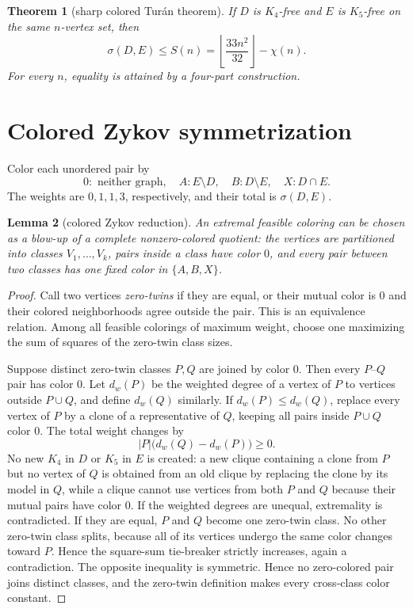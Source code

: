 \documentclass[11pt]{article}
\theoremstyle{plain}
\newtheorem{theorem}{Theorem}[section]
\newtheorem{lemma}[theorem]{Lemma}
\theoremstyle{definition}
\theoremstyle{remark}
\newcommand{\1}{\mathbf 1}
\begin{document}
\begin{theorem}[sharp colored Tur\'an theorem]\label{thm:colored}
If $D$ is $K_4$-free and $E$ is $K_5$-free on the same $n$-vertex set, then
\begin{equation}\label{eq:colored}
 \sigma(D,E)\leq S(n)
 =\left\lfloor\frac{33n^2}{32}\right\rfloor-\chi(n).
\end{equation}
For every $n$, equality is attained by a four-part construction.
\end{theorem}

\section{Colored Zykov symmetrization}\label{sec:zykov}

Color each unordered pair by
\[
 0:\text{ neither graph},\quad
 A:E\setminus D,\quad
 B:D\setminus E,\quad
 X:D\cap E.
\]
The weights are $0,1,1,3$, respectively, and their total is $\sigma(D,E)$.

\begin{lemma}[colored Zykov reduction]\label{lem:zykov}
An extremal feasible coloring can be chosen as a blow-up of a complete
nonzero-colored quotient: the vertices are partitioned into classes
$V_1,\ldots,V_k$, pairs inside a class have color $0$, and every pair between
two classes has one fixed color in $\{A,B,X\}$.
\end{lemma}

\begin{proof}
Call two vertices \emph{zero-twins} if they are equal, or their mutual color
is $0$ and their colored neighborhoods agree outside the pair.  This is an
equivalence relation.  Among all feasible colorings of maximum weight, choose
one maximizing the sum of squares of the zero-twin class sizes.

Suppose distinct zero-twin classes $P,Q$ are joined by color $0$.  Then every
$P$--$Q$ pair has color $0$.  Let $d_w(P)$ be the weighted degree of a vertex
of $P$ to vertices outside $P\cup Q$, and define $d_w(Q)$ similarly.  If
$d_w(P)\leq d_w(Q)$, replace every vertex of $P$ by a clone of a representative
of $Q$, keeping all pairs inside $P\cup Q$ color $0$.  The total weight changes
by
\[
 |P|\bigl(d_w(Q)-d_w(P)\bigr)\geq0.
\]
No new $K_4$ in $D$ or $K_5$ in $E$ is created: a new clique containing a
clone from $P$ but no vertex of $Q$ is obtained from an old clique by replacing
the clone by its model in $Q$, while a clique cannot use vertices from both
$P$ and $Q$ because their mutual pairs have color $0$.  If the weighted
degrees are unequal, extremality is contradicted.  If they are equal, $P$ and
$Q$ become one zero-twin class.  No other zero-twin class splits, because all
of its vertices undergo the same color changes toward $P$.  Hence the
square-sum tie-breaker strictly increases, again a contradiction.  The
opposite inequality is symmetric.  Hence no zero-colored pair joins distinct classes,
and the zero-twin definition makes every cross-class color constant.
\end{proof}
\end{document}
